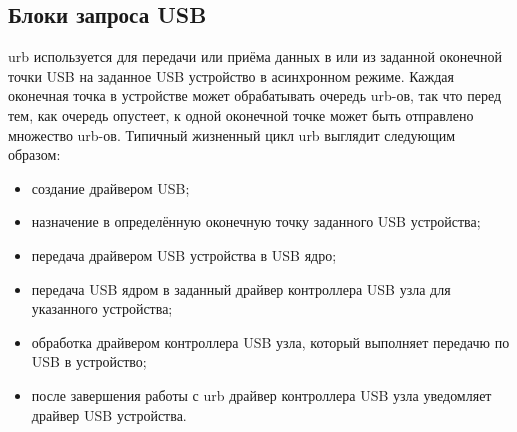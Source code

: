 \subsection{Блоки запроса USB}
urb используется для передачи или приёма данных в или из заданной оконечной точки USB
на заданное USB устройство в асинхронном режиме. Каждая оконечная точка в
устройстве может обрабатывать очередь urb-ов, так что перед тем, как очередь опустеет, к
одной оконечной точке может быть отправлено множество urb-ов. Типичный жизненный цикл
urb выглядит следующим образом:
\begin{itemize}
	\item создание драйвером USB;
	\item назначение в определённую оконечную точку заданного USB устройства;
	\item передача драйвером USB устройства в USB ядро;
	\item передача USB ядром в заданный драйвер контроллера USB узла для указанного
	устройства;
	\item обработка драйвером контроллера USB узла, который выполняет передачю по USB в
	устройство;
	\item после завершения работы с urb драйвер контроллера USB узла уведомляет драйвер USB
	устройства.
\end{itemize}


\pagebreak

